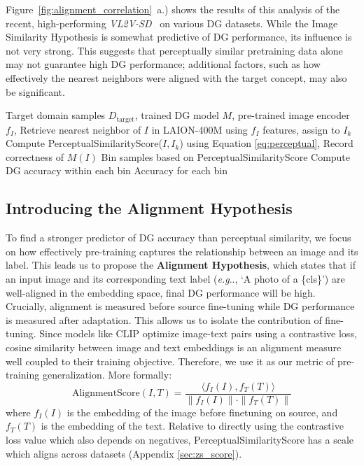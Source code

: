 \documentclass{article} %
\makeatletter
\DeclareRobustCommand\onedot{\futurelet\@let@token\@onedot}
\def\@onedot{\ifx\@let@token.\else.\null\fi\xspace}
\def\eg{\emph{e.g}\onedot} \def\Eg{\emph{E.g}\onedot}
\makeatother
\begin{document}
Figure~\ref{fig:alignment_correlation}~a.) shows the results of this analysis of the recent, high-performing \textit{VL2V-SD}~\citep{addepalli2024leveraging} on various DG datasets. While the Image Similarity Hypothesis is somewhat predictive of DG performance, its influence is not very strong. 
 This suggests that perceptually similar pretraining data alone may not guarantee high DG performance; additional factors, such as how effectively the nearest neighbors  were aligned with the target concept, may also be significant.


\begin{algorithm}[t]
\caption{Evaluating the Image Similarity Hypothesis}
\label{alg:alignment_eval}
\begin{algorithmic}[1]
\Require Target domain samples \(D_{\text{target}}\), trained DG model \(M\), pre-trained image encoder \(f_I\), 
    \State Retrieve nearest neighbor of $I$ in LAION-400M using \(f_I\) features, assign to $I_k$
    \State Compute PerceptualSimilarityScore($I,I_k$) using Equation \ref{eq:perceptual},
    \State Record  correctness of \(M(I)\)
\EndFor
\State Bin samples based on PerceptualSimilarityScore
\State Compute DG accuracy within each bin
\State \Return Accuracy for each bin
\end{algorithmic}
\end{algorithm}
\color{black}

\subsection{Introducing the Alignment Hypothesis}
\label{sec:alignment}


To find a stronger predictor of DG accuracy than perceptual similarity,  we focus on how effectively pre-training captures the relationship between an image and its label. This leads us to propose the \textbf{Alignment Hypothesis}, which states that if an input image and its corresponding text label (\eg, ‘A photo of a \{cls\}’) are well-aligned in the embedding space, final DG performance will be high. Crucially, alignment is measured before source fine-tuning while DG performance is measured after adaptation. This allows us to isolate the contribution of fine-tuning.  Since  models like CLIP optimize image-text pairs using a contrastive loss, cosine similarity between image and text embeddings is an alignment measure well coupled to their training objective. Therefore, we use it as our metric of pre-training generalization.  More formally: 
\begin{equation} 
\text{AlignmentScore}(I, T) = \frac{\langle f_I(I), f_T(T) \rangle}{\|f_I(I)\| \cdot \|f_T(T)\|}
\tag{Eq.\ 2}
\end{equation}
where \(f_I(I)\) is the  embedding of the image before finetuning on source, and \(f_T(T)\) is the  embedding of the text. Relative to directly using the contrastive loss value which also depends on negatives, PerceptualSimilarityScore has a scale which aligns across datasets (Appendix \ref{sec:zs_score}). 
\end{document}
